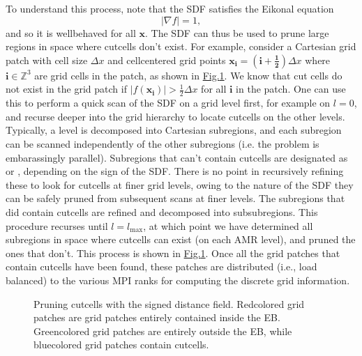 \documentclass[letterpaper,10pt,english]{sphinxmanual}
\let\sphinxpxdimen\pdfpxdimen\else\newdimen\sphinxpxdimen
\begin{document}
\sphinxAtStartPar
To understand this process, note that the SDF satisfies the Eikonal equation
\begin{equation}
\left|\nabla f\right| = 1,
\end{equation}
\sphinxAtStartPar
and so it is well\sphinxhyphen{}behaved for all \(\mathbf{x}\).
The SDF can thus be used to prune large regions in space where cut\sphinxhyphen{}cells don’t exist.
For example, consider a Cartesian grid patch with cell size \(\Delta x\) and cell\sphinxhyphen{}centered grid points \(\mathbf{x}_{\mathbf{i}} = \left(\mathbf{i} + \mathbf{\frac{1}{2}}\right)\Delta x\) where \(\mathbf{i} \in \mathbb{Z}^3\) are grid cells in the patch, as shown in \hyperref[\detokenize{Source/SpatialDiscretization:fig-pruning}]{Fig.\@ \ref{\detokenize{Source/SpatialDiscretization:fig-pruning}}}.
We know that cut cells do not exist in the grid patch if \(\left|f\left(\mathbf{x}_{\mathbf{i}}\right)\right| > \frac{1}{2}\Delta x\) for all \(\mathbf{i}\) in the patch.
One can use this to perform a quick scan of the SDF on a  grid level first, for example on \(l=0\), and recurse deeper into the grid hierarchy to locate cut\sphinxhyphen{}cells on the other levels.
Typically, a level is decomposed into Cartesian subregions, and each subregion can be scanned independently of the other subregions (i.e. the problem is embarassingly parallel).
Subregions that can’t contain cut\sphinxhyphen{}cells are designated as  or , depending on the sign of the SDF.
There is no point in recursively refining these to look for cut\sphinxhyphen{}cells at finer grid levels, owing to the nature of the SDF they can be safely pruned from subsequent scans at finer levels.
The subregions that did contain cut\sphinxhyphen{}cells are refined and decomposed into sub\sphinxhyphen{}subregions.
This procedure recurses until \(l=l_{\text{max}}\), at which point we have determined all sub\sphinxhyphen{}regions in space where cut\sphinxhyphen{}cells can exist (on each AMR level), and pruned the ones that don’t.
This process is shown in \hyperref[\detokenize{Source/SpatialDiscretization:fig-pruning}]{Fig.\@ \ref{\detokenize{Source/SpatialDiscretization:fig-pruning}}}.
Once all the grid patches that contain cut\sphinxhyphen{}cells have been found, these patches are distributed (i.e., load balanced) to the various MPI ranks for computing the discrete grid information.

\begin{figure}[htb]
\centering
\capstart

\noindent\sphinxincludegraphics[width=600\sphinxpxdimen]{{Pruning}.png}
\caption{Pruning cut\sphinxhyphen{}cells with the signed distance field.
Red\sphinxhyphen{}colored grid patches are grid patches entirely contained inside the EB.
Green\sphinxhyphen{}colored grid patches are entirely outside the EB, while blue\sphinxhyphen{}colored grid patches contain cut\sphinxhyphen{}cells.}\label{\detokenize{Source/SpatialDiscretization:id10}}\label{\detokenize{Source/SpatialDiscretization:fig-pruning}}\end{figure}
\end{document}

